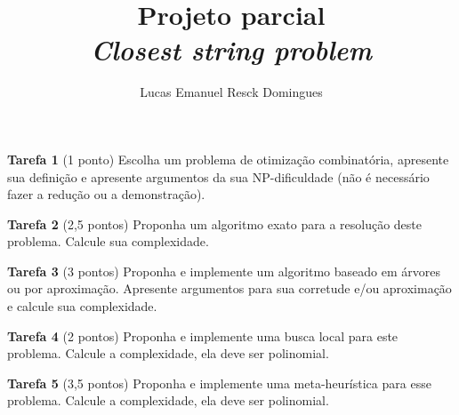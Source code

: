 \documentclass{article}
\title{Projeto parcial \\
\large \textit{Closest string problem}}
\author{Lucas Emanuel Resck Domingues}
\begin{document}
    \maketitle
    
    \noindent \textbf{Tarefa 1} (1 ponto) Escolha um problema de otimização combinatória, apresente sua definição e apresente argumentos da sua NP-dificuldade (não é necessário fazer a redução ou a demonstração).

    \bigskip

    

    \newpage
    
    \noindent \textbf{Tarefa 2} (2,5 pontos) Proponha um algoritmo exato para a resolução deste     problema. Calcule sua complexidade.

    \bigskip

    

    \newpage
    
    \noindent \textbf{Tarefa 3} (3 pontos) Proponha e implemente um algoritmo baseado em árvores
    ou por aproximação. Apresente argumentos para sua corretude e/ou aproximação e calcule sua complexidade.

    \bigskip

    

    \newpage
    
    \noindent \textbf{Tarefa 4} (2 pontos) Proponha e implemente uma busca local para este problema. Calcule a complexidade, ela deve ser polinomial.

    \bigskip

    

    \newpage
    
    \noindent \textbf{Tarefa 5} (3,5 pontos) Proponha e implemente uma meta-heurística para esse
    problema. Calcule a complexidade, ela deve ser polinomial.

    \bigskip

    

    \newpage

    \printbibliography
\end{document}
